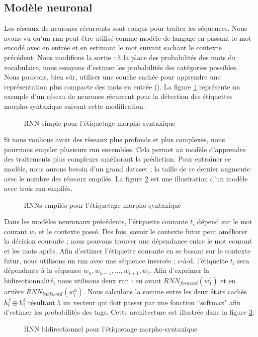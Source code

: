 \documentclass{KodeBook}
\begin{document}
\subsection{Modèle neuronal}

Les réseaux de neurones récurrents sont conçus pour traiter les séquences.
Nous avons vu qu'un \ac{rnn} peut être utilisé comme modèle de langage en passant le mot encodé avec  en entrée et en estimant le mot suivant sachant le contexte précédent. 
Nous modifions la sortie : à la place des probabilités des mots du vocabulaire, nous essayons d'estimer les probabilités des catégories possibles. 
Nous pouvons, bien sûr, utiliser une couche cachée pour apprendre une représentation plus compacte des mots en entrée (). 
La figure \ref{fig:pos-rnn1} représente un exemple d'un réseau de neurones récurrent pour la détection des étiquettes morpho-syntaxique suivant cette modification.
\begin{figure}[!ht]
	\centering
	\caption[RNN simple pour l'étiquetage morpho-syntaxique]{RNN simple pour l'étiquetage morpho-syntaxique \cite{2019-jurafsky-martin}\label{fig:pos-rnn1}}
\end{figure}

Si nous voulions avoir des réseaux plus profonds et plus complexes, nous pourrions empiler plusieurs \ac{rnn} ensembles. 
Cela permet au modèle d'apprendre des traitements plus complexes améliorant la prédiction.
Pour entraîner ce modèle, nous aurons besoin d'un grand dataset ; la taille de ce dernier augmente avec le nombre des réseaux empilés.
La figure \ref{fig:pos-rnn2} est une illustration d'un modèle avec trois \ac{rnn} empilés.
\begin{figure}[!ht]
	\centering
	\caption[RNNs empilés pour l'étiquetage morpho-syntaxique]{RNNs empilés pour l'étiquetage morpho-syntaxique \cite{2019-jurafsky-martin}\label{fig:pos-rnn2}}
\end{figure}

Dans les modèles neuronaux précédents, l'étiquette courante $t_i$ dépend sur le mot courant $w_i$ et le contexte passé. 
Des fois, savoir le contexte futur peut améliorer la décision courante ; nous pouvons trouver une dépendance entre le mot courant et les mots après. 
Afin d'estimer l'étiquette courante en se basant sur le contexte futur, nous utilisons un \ac{rnn} avec une séquence inversée ; c-à-d. l'étiquette $t_i$ sera dépendante à la séquence $w_n, w_{n-1}, \ldots, w_{i+1}, w_{i}$. 
Afin d'exprimer la bidirectionnalité, nous utilisons deux \ac{rnn} : en avant $RNN_{forward}(w_1^i)$ et en arrière $RNN_{backword}(w_i^n)$. 
Nous calculons la somme entre les deux états cachés $h_i^f \oplus h_i^b$ résultant à un vecteur qui doit passer par une fonction ``softmax" afin d'estimer les probabilités des tags. 
Cette architecture est illustrée dans la figure \ref{fig:pos-rnn3}.
\begin{figure}[!ht]
	\centering
	\caption[RNN bidirectionnel pour l'étiquetage morpho-syntaxique]{RNN bidirectionnel pour l'étiquetage morpho-syntaxique \cite{2019-jurafsky-martin}\label{fig:pos-rnn3}}
\end{figure}
\end{document}
